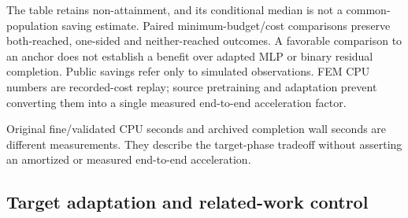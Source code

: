 \documentclass[10pt,twocolumn]{article}
\begin{document}
The table retains non-attainment, and its conditional median is not a common-population saving estimate. Paired minimum-budget/cost comparisons preserve both-reached, one-sided and neither-reached outcomes. A favorable comparison to an anchor does not establish a benefit over adapted MLP or binary residual completion. Public savings refer only to simulated observations. FEM CPU numbers are recorded-cost replay; source pretraining and adaptation prevent converting them into a single measured end-to-end acceleration factor.

\begin{table}[t]\centering\small{}\caption{Historical recorded characterization CPU and measured adaptation/completion wall costs, kept separate.}\end{table}


Original fine/validated CPU seconds and archived completion wall seconds are different measurements. They describe the target-phase tradeoff without asserting an amortized or measured end-to-end acceleration.

\subsection*{Target adaptation and related-work control}
\end{document}
